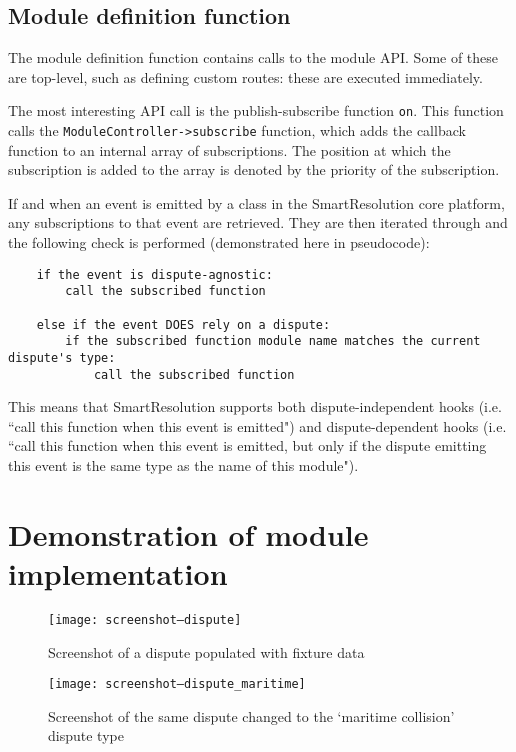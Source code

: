 \subsection{Module definition function}

The module definition function contains calls to the module API. Some of these are top-level, such as defining custom routes: these are executed immediately.

The most interesting API call is the publish-subscribe function \lstinline{on}. This function calls the \lstinline{ModuleController->subscribe} function, which adds the callback function to an internal array of subscriptions. The position at which the subscription is added to the array is denoted by the priority of the subscription.

If and when an event is emitted by a class in the SmartResolution core platform, any subscriptions to that event are retrieved. They are then iterated through and the following check is performed (demonstrated here in pseudocode):

\begin{lstlisting}
	if the event is dispute-agnostic:
	    call the subscribed function
	
	else if the event DOES rely on a dispute:
	    if the subscribed function module name matches the current dispute's type:
	        call the subscribed function
\end{lstlisting}

This means that SmartResolution supports both dispute-independent hooks (i.e. ``call this function when this event is emitted") and dispute-dependent hooks (i.e. ``call this function when this event is emitted, but only if the dispute emitting this event is the same type as the name of this module"). 

\section{Demonstration of module implementation}

\begin{figure}[h!]
  \centering
    \ifimages
    \texttt{[image: screenshot--dispute]}
    \fi
  \caption{Screenshot of a dispute populated with fixture data}
  \label{screenshot:dispute}
\end{figure}

\begin{figure}[h!]
  \centering
    \ifimages
    \texttt{[image: screenshot--dispute\_maritime]}
    \fi
  \caption{Screenshot of the same dispute changed to the `maritime collision' dispute type}
  \label{screenshot:disputeMaritime}
\end{figure}

